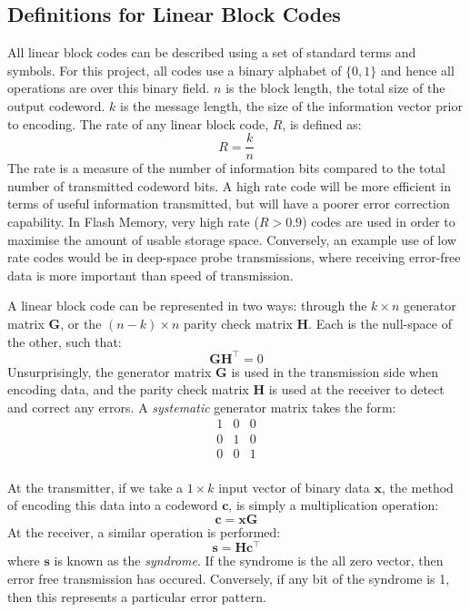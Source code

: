 \documentclass[11pt]{article}
\begin{document}
\subsection{Definitions for Linear Block Codes}
All linear block codes can be described using a set of standard terms and symbols. For this project, all codes use a binary alphabet of $\{0,1\}$ and hence all operations are over this binary field. $n$ is the block length, the total size of the output codeword. $k$ is the message length, the size of the information vector prior to encoding. The rate of any linear block code, $R$, is defined as: 
\begin{equation}
R = \dfrac{k}{n}
\end{equation}
The rate is a measure of the number of information bits compared to the total number of transmitted codeword bits. A high rate code will be more efficient in terms of useful information transmitted, but will have a poorer error correction capability. In Flash Memory, very high rate ($R > 0.9$) codes are used in order to maximise the amount of usable storage space. Conversely, an example use of low rate codes would be in deep-space probe transmissions, where receiving error-free data is more important than speed of transmission.

A linear block code can be represented in two ways: through the $k \times n$ generator matrix $\mathbf{G}$, or the $(n - k) \times n$ parity check matrix $\mathbf{H}$. Each is the null-space of the other, such that:
\begin{equation}
\mathbf{G H^\intercal} = 0
\end{equation}
Unsurprisingly, the generator matrix $\mathbf{G}$ is used in the transmission side when encoding data, and the parity check matrix $\mathbf{H}$ is used at the receiver to detect and correct any errors. A \textit{systematic} generator matrix takes the form:
\begin{equation}
\begin{array}{ccc}
  1 & 0 & 0 \\
  0 & 1 & 0 \\
  0 & 0 & 1	 \\
  \end{array}
\end{equation}

At the transmitter, if we take a $1 \times k$ input vector of binary data $\mathbf{x}$, the method of encoding this data into a codeword $\mathbf{c}$, is simply a multiplication operation:
\begin{equation}
\mathbf{c = xG}
\end{equation}
At the receiver, a similar operation is performed:
\begin{equation}
\mathbf{s = Hc^\intercal} 
\end{equation}
where $\mathbf{s}$ is known as the \textit{syndrome}. If the syndrome is the all zero vector, then error free transmission has occured. Conversely, if any bit of the syndrome is 1, then this represents a particular error pattern.
\end{document}
